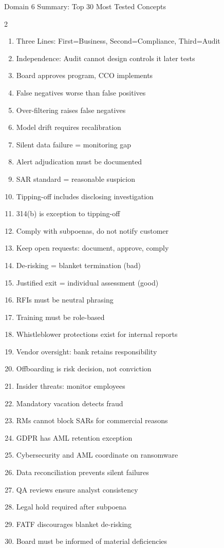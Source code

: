 \documentclass[11pt,a4paper]{beamer}
\begin{document}
\begin{frame}{Domain 6 Summary: Top 30 Most Tested Concepts}
	\begin{multicols}{2}
		\begin{enumerate}
			\item Three Lines: First=Business, Second=Compliance, Third=Audit
			\item Independence: Audit cannot design controls it later tests
			\item Board approves program, CCO implements
			\item False negatives worse than false positives
			\item Over-filtering raises false negatives
			\item Model drift requires recalibration
			\item Silent data failure = monitoring gap
			\item Alert adjudication must be documented
			\item SAR standard = reasonable suspicion
			\item Tipping-off includes disclosing investigation
			\item 314(b) is exception to tipping-off
			\item Comply with subpoenas, do not notify customer
			\item Keep open requests: document, approve, comply
			\item De-risking = blanket termination (bad)
			\item Justified exit = individual assessment (good)
			\item RFIs must be neutral phrasing
			\item Training must be role-based
			\item Whistleblower protections exist for internal reports
			\item Vendor oversight: bank retains responsibility
			\item Offboarding is risk decision, not conviction
			\item Insider threats: monitor employees
			\item Mandatory vacation detects fraud
			\item RMs cannot block SARs for commercial reasons
			\item GDPR has AML retention exception
			\item Cybersecurity and AML coordinate on ransomware
			\item Data reconciliation prevents silent failures
			\item QA reviews ensure analyst consistency
			\item Legal hold required after subpoena
			\item FATF discourages blanket de-risking
			\item Board must be informed of material deficiencies
		\end{enumerate}
	\end{multicols}
\end{frame}
\end{document}

